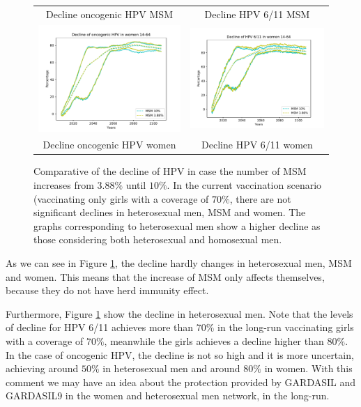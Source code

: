 \begin{figure}[!]
\begin{tabular}{cc}
		Decline oncogenic HPV MSM	& Decline HPV 6/11 MSM \\ 
		\includegraphics[width=0.5\linewidth]{IMGs/13.-Aumento_MSM/onco_muj.pdf}	& 
		\includegraphics[width=0.5\linewidth]{IMGs/13.-Aumento_MSM/verr_muj.pdf}  \\ 
		Decline oncogenic HPV women	& Decline HPV 6/11 women \\ 
	\end{tabular} 
	\caption{Comparative of the decline of HPV in case the number of MSM increases from $3.88\%$ until $10\%$. In the current vaccination scenario (vaccinating only girls with a coverage of $70\%$, there are not significant declines in heterosexual men, MSM and women. The graphs corresponding to heterosexual men show a higher decline as those considering both heterosexual and homosexual men.}
	\label{fig:compara_MSM}
\end{figure}

As we can see in Figure \ref{fig:compara_MSM}, the decline hardly changes in heterosexual men, MSM and women. This means that the increase of MSM only affects themselves, because they do not have herd immunity effect.

Furthermore, Figure \ref{fig:compara_MSM} show the decline in heterosexual men. Note that the levels of decline for HPV 6/11 achieves more than $70\%$ in the long-run vaccinating girls with a coverage of $70\%$, meanwhile the girls achieves a decline higher than $80\%$. In the case of oncogenic HPV, the decline is not so high and it is more uncertain, achieving around $50\%$ in heterosexual men and around $80\%$ in women. With this comment we may have an idea about the protection provided by GARDASIL and GARDASIL9 in the women and heterosexual men network, in the long-run.